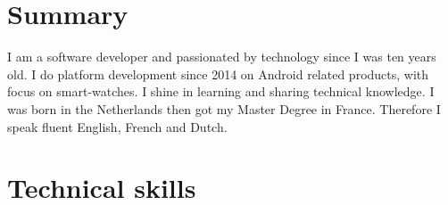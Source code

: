 \documentclass[a4paper,11pt,sans]{moderncv}
\begin{document}
\maketitle

\section{Summary}
I am a software developer and passionated by technology since I was ten years old.
I do platform development since 2014 on Android related products, with focus on smart-watches.
I shine in learning and sharing technical knowledge.
I was born in the Netherlands then got my Master Degree in France.
Therefore I speak fluent English, French and Dutch.

\section{Technical skills}
\begin{cvcolumns}
\end{cvcolumns}
    
\end{document}
